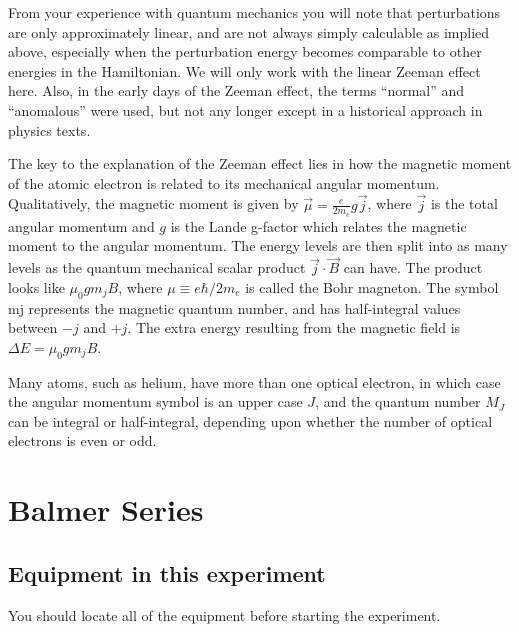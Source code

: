 \documentclass{../lab}
\begin{document}
From your experience with quantum mechanics you will note that perturbations are only approximately linear, and are not always simply calculable as implied above, especially when the perturbation energy becomes comparable to other energies in the Hamiltonian. We will only work with the linear Zeeman effect here. Also, in the early days of the Zeeman effect, the terms ``normal'' and ``anomalous'' were used, but not any longer except in a historical approach in physics texts.

The key to the explanation of the Zeeman effect lies in how the magnetic moment of the atomic electron is related to its mechanical angular momentum. Qualitatively, the magnetic moment is given by $\vec\mu =\frac{e}{2m_e}g\vec j$, where $\vec j$ is the total angular momentum and $g$ is the Lande g-factor which relates the magnetic moment to the angular momentum. The energy levels are then split into as many levels as the quantum mechanical scalar product $\vec j\cdot\vec B$ can have. The product looks like ${\mu_{0} g m_{j}B}$, where $\mu\equiv e\hbar/2m_e$ is called the Bohr magneton. The symbol mj represents the magnetic quantum number, and has half-integral values between $-j $ and $+j$. The extra energy resulting from the magnetic field is $ \Delta E = {\mu_{0} g m_{j}B}$.

Many atoms, such as helium, have more than one optical electron, in which case the angular momentum symbol is an upper case $J$, and the quantum number $M_J$ can be integral or half-integral, depending upon whether the number of optical electrons is even or odd.

\section{Balmer Series}

\subsection{Equipment in this experiment}

You should locate all of the equipment before starting the experiment.
\end{document}
